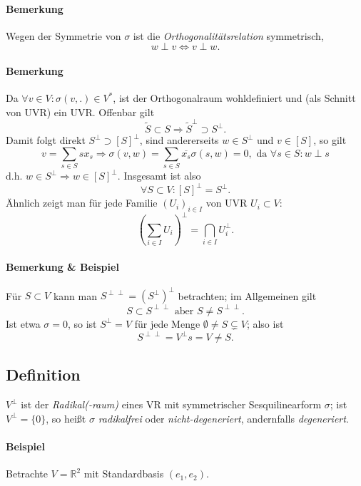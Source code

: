 \paragraph{Bemerkung}
	Wegen der Symmetrie von $ \sigma $ ist die \emph{Orthogonalitätsrelation} symmetrisch,
		\[ w \perp v \Leftrightarrow v \perp w. \]
\paragraph{Bemerkung}
	Da $ \forall v\in V: \sigma(v,.) \in V^* $, ist der Orthogonalraum wohldefiniert und (als Schnitt von UVR) ein UVR. Offenbar gilt
		\[ \tilde{S} \subset S \Rightarrow \tilde{S}^\perp \supset S^\perp. \]
	Damit folgt direkt $ S^\perp \supset [S]^\perp $, sind andererseits $ w\in S^\perp $ und $ v\in [S] $, so gilt
		\[ v = \sum_{s\in S}sx_s \Rightarrow \sigma(v,w)= \sum_{s\in S}\overline{x_s}\sigma(s,w) = 0, \text{ da } \forall s\in S: w\perp s \]
	d.h. $ w\in S^\perp \Rightarrow w\in [S]^\perp. $ Insgesamt ist also
		\[ \forall S \subset V: [S]^\perp=S^\perp.\]
	Ähnlich zeigt man für jede Familie $ (U_i)_{i\in I} $ von UVR $ U_i\subset V $:
		\[ \left(\sum_{i\in I}U_i \right)^\perp= \bigcap_{i\in I} U_i^\perp. \]
\paragraph{Bemerkung \& Beispiel}
	Für $ S\subset V $ kann man $ S^{\perp\perp} = \left(S^\perp\right)^\perp $ betrachten; im Allgemeinen gilt
		\[ S\subset S^{\perp\perp} \text{ aber } S\neq S^{\perp\perp}. \]
	Ist etwa $ \sigma = 0 $, so ist $ S^\perp = V $ für jede Menge $ \emptyset \neq S\subsetneq V $; also ist
		\[ S^{\perp\perp} = V^\perp s = V \neq S. \]

\subsection{Definition}
\begin{Definition}
$ V^\perp $ ist der \emph{Radikal(-raum)} eines VR mit symmetrischer Sesquilinearform $ \sigma $; ist $ V^\perp = \{0 \} $, so heißt $ \sigma $ \emph{radikalfrei} oder \emph{nicht-degeneriert}, andernfalls \emph{degeneriert}.
\end{Definition}
\paragraph{Beispiel}
	Betrachte $ V=\mathbb{R}^2 $ mit Standardbasis $ (e_1,e_2) $.
	
